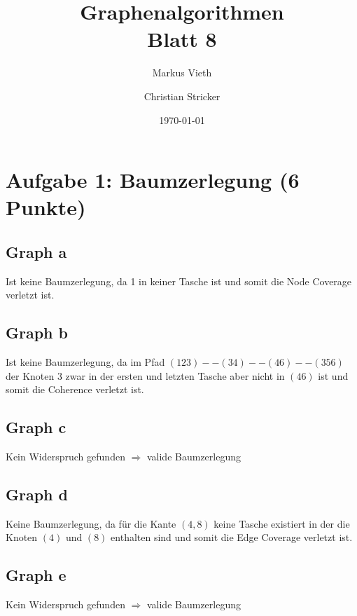 \documentclass[a4paper,11pt,twoside]{scrartcl}
\title{Graphenalgorithmen\\ Blatt 8}
\author{Markus Vieth\and Christian Stricker}
\date{\today}
\begin{document}
\maketitle
\cleardoublepage
\pagestyle{myheadings}

\newpage
\section{Aufgabe 1: Baumzerlegung (6 Punkte)}
\subsection{Graph a}
Ist keine Baumzerlegung, da 1 in keiner Tasche ist und somit die Node Coverage verletzt ist.
\subsection{Graph b}
Ist keine Baumzerlegung, da im Pfad $(123) -- (34) -- (46) -- (356)$ der Knoten $3$ zwar in der ersten und letzten Tasche aber nicht in $(46)$ ist und somit die Coherence verletzt ist.
\subsection{Graph c}
Kein Widerspruch gefunden $\Rightarrow$ valide Baumzerlegung
\subsection{Graph d}
Keine Baumzerlegung, da für die Kante $(4,8)$ keine Tasche existiert in der die Knoten $(4)$ und $(8)$ enthalten sind und somit die Edge Coverage verletzt ist.
\subsection{Graph e}
Kein Widerspruch gefunden $\Rightarrow$ valide Baumzerlegung
\end{document}

